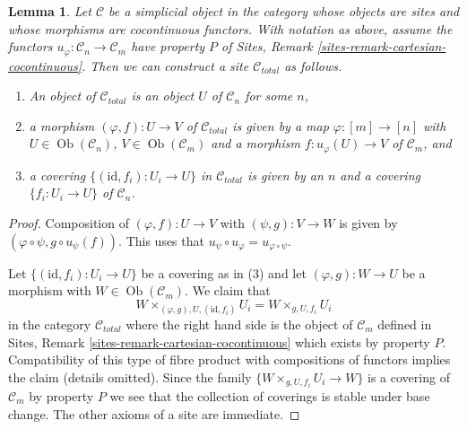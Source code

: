 \documentclass{stacks-project}
\theoremstyle{plain}
\newtheorem{lemma}[subsection]{Lemma}
\theoremstyle{definition}
\theoremstyle{remark}
\numberwithin{equation}{subsection}
\def\Ob{\mathop{\mathrm{Ob}}\nolimits}
\begin{document}
\begin{lemma}
\label{lemma-simplicial-cocontinuous-site}
Let $\mathcal{C}$ be a simplicial object in the category whose objects are
sites and whose morphisms are cocontinuous functors. With notation as above,
assume the functors $u_\varphi : \mathcal{C}_n \to \mathcal{C}_m$
have property $P$ of Sites, Remark \ref{sites-remark-cartesian-cocontinuous}.
Then we can construct a site $\mathcal{C}_{total}$ as follows.
\begin{enumerate}
\item An object of $\mathcal{C}_{total}$ is an object $U$ of
$\mathcal{C}_n$ for some $n$,
\item a morphism $(\varphi, f) : U \to V$ of $\mathcal{C}_{total}$
is given by a map $\varphi : [m] \to [n]$ with
$U \in \Ob(\mathcal{C}_n)$, $V \in \Ob(\mathcal{C}_m)$
and a morphism $f : u_\varphi(U) \to V$ of $\mathcal{C}_m$, and
\item a covering $\{(\text{id}, f_i) :  U_i \to U\}$ in $\mathcal{C}_{total}$
is given by an $n$ and a covering $\{f_i : U_i \to U\}$
of $\mathcal{C}_n$.
\end{enumerate}
\end{lemma}

\begin{proof}
Composition of $(\varphi, f) : U \to V$ with $(\psi, g) : V \to W$
is given by $(\varphi \circ \psi, g \circ u_\psi(f))$.
This uses that $u_\psi \circ u_\varphi = u_{\varphi \circ \psi}$.

\medskip\noindent
Let $\{(\text{id}, f_i) :  U_i \to U\}$ be a covering as in (3)
and let $(\varphi, g) : W \to U$ be a morphism with
$W \in \Ob(\mathcal{C}_m)$. We claim that
$$
W \times_{(\varphi, g), U, (\text{id}, f_i)} U_i =
W \times_{g, U, f_i} U_i
$$
in the category $\mathcal{C}_{total}$ where the right hand side
is the object of $\mathcal{C}_m$ defined in
Sites, Remark \ref{sites-remark-cartesian-cocontinuous}
which exists by property $P$. Compatibility of this type of fibre product
with compositions of functors implies the claim (details omitted).
Since the family $\{W \times_{g, U, f_i} U_i \to W\}$ is a
covering of $\mathcal{C}_m$ by property $P$ we see that
the collection of coverings is stable under base
change. The other axioms of a site are immediate.
\end{proof}
\end{document}
